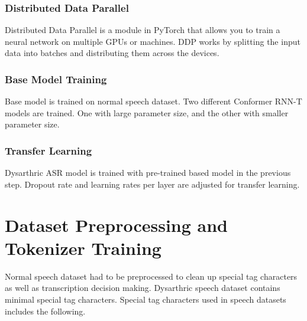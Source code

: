 \documentclass[9pt,final,a4paper]{IEEEtran}
\begin{document}
\subsubsection{Distributed Data Parallel}

Distributed Data Parallel is a module in PyTorch that allows you to train a neural network on multiple GPUs or machines.
DDP works by splitting the input data into batches and distributing them across the devices\cite{cite4}.

\subsubsection{Base Model Training}

Base model is trained on normal speech dataset. Two different Conformer RNN-T models are trained.
One with large parameter size, and the other with smaller parameter size.

\subsubsection{Transfer Learning}

Dysarthric ASR model is trained with pre-trained based model in the previous step. Dropout rate and learning rates per layer are adjusted for transfer learning\cite{cite6}\cite{cite7}.

\section{Dataset Preprocessing and Tokenizer Training}

Normal speech dataset had to be preprocessed to clean up special tag characters as well as transcription decision making.
Dysarthric speech dataset contains minimal special tag characters.
Special tag characters used in speech datasets includes the following.
\end{document}
